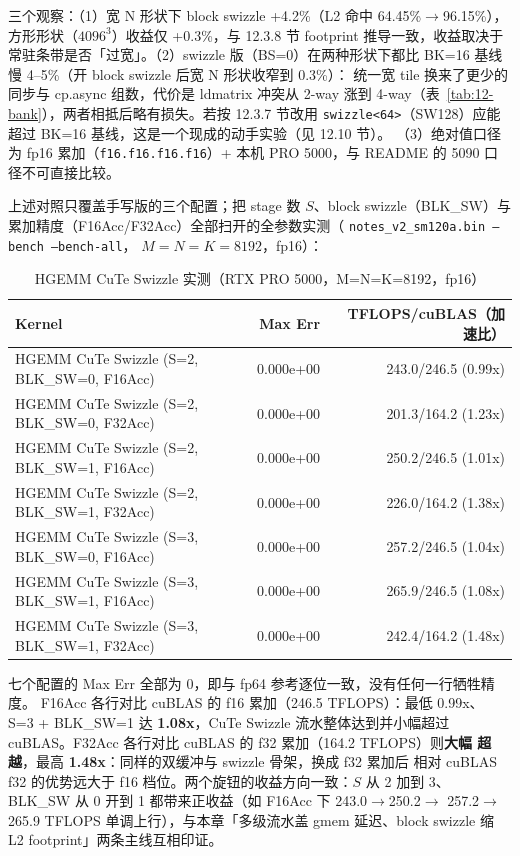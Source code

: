 三个观察：（1）宽 N 形状下 block swizzle +4.2\%（L2 命中 64.45\%$\to$96.15\%），
方形形状（$4096^3$）收益仅 +0.3\%，与 12.3.8 节 footprint 推导一致，收益取决于
常驻条带是否「过宽」。（2）swizzle 版（BS=0）在两种形状下都比 BK=16 基线慢
4--5\%（开 block swizzle 后宽 N 形状收窄到 0.3\%）：
统一宽 tile 换来了更少的同步与 cp.async 组数，代价是 ldmatrix 冲突从 2-way 涨到
4-way（表~\ref{tab:12-bank}），两者相抵后略有损失。若按 12.3.7 节改用
\texttt{swizzle<64>}（SW128）应能超过 BK=16 基线，这是一个现成的动手实验（见 12.10 节）。
（3）绝对值口径为 fp16 累加（\texttt{f16.f16.f16.f16}）+ 本机 PRO 5000，与
README 的 5090 口径不可直接比较。

上述对照只覆盖手写版的三个配置；把 stage 数 $S$、block swizzle（BLK\_SW）与
累加精度（F16Acc/F32Acc）全部扫开的全参数实测（
\texttt{notes\_\allowbreak{}v2\_\allowbreak{}sm120a.bin --bench --bench-all}，
$M{=}N{=}K{=}8192$，fp16）：

\begin{table}[H]
\centering
\caption{HGEMM CuTe Swizzle 实测（RTX PRO 5000，M=N=K=8192，fp16）}
\label{tab:ch12-perf}
\small
\setlength{\tabcolsep}{4pt}
\begin{tabular}{lrr}
\toprule
Kernel & Max Err & TFLOPS/cuBLAS（加速比） \\
\midrule
HGEMM CuTe Swizzle (S=2, BLK\_SW=0, F16Acc) & 0.000e+00 & 243.0/246.5 (0.99x) \\
HGEMM CuTe Swizzle (S=2, BLK\_SW=0, F32Acc) & 0.000e+00 & 201.3/164.2 (1.23x) \\
HGEMM CuTe Swizzle (S=2, BLK\_SW=1, F16Acc) & 0.000e+00 & 250.2/246.5 (1.01x) \\
HGEMM CuTe Swizzle (S=2, BLK\_SW=1, F32Acc) & 0.000e+00 & 226.0/164.2 (1.38x) \\
HGEMM CuTe Swizzle (S=3, BLK\_SW=0, F16Acc) & 0.000e+00 & 257.2/246.5 (1.04x) \\
HGEMM CuTe Swizzle (S=3, BLK\_SW=1, F16Acc) & 0.000e+00 & 265.9/246.5 (1.08x) \\
HGEMM CuTe Swizzle (S=3, BLK\_SW=1, F32Acc) & 0.000e+00 & 242.4/164.2 (1.48x) \\
\bottomrule
\end{tabular}
\end{table}

七个配置的 Max Err 全部为 $0$，即与 fp64 参考逐位一致，没有任何一行牺牲精度。
F16Acc 各行对比 cuBLAS 的 f16 累加（246.5 TFLOPS）：最低 0.99x、
S=3 + BLK\_SW=1 达 \textbf{1.08x}，CuTe Swizzle 流水整体达到并小幅超过
cuBLAS。F32Acc 各行对比 cuBLAS 的 f32 累加（164.2 TFLOPS）则\textbf{大幅
超越}，最高 \textbf{1.48x}：同样的双缓冲与 swizzle 骨架，换成 f32 累加后
相对 cuBLAS f32 的优势远大于 f16 档位。两个旋钮的收益方向一致：$S$ 从 2
加到 3、BLK\_SW 从 0 开到 1 都带来正收益（如 F16Acc 下 243.0$\to$250.2$\to$
257.2$\to$265.9 TFLOPS 单调上行），与本章「多级流水盖 gmem 延迟、block
swizzle 缩 L2 footprint」两条主线互相印证。

